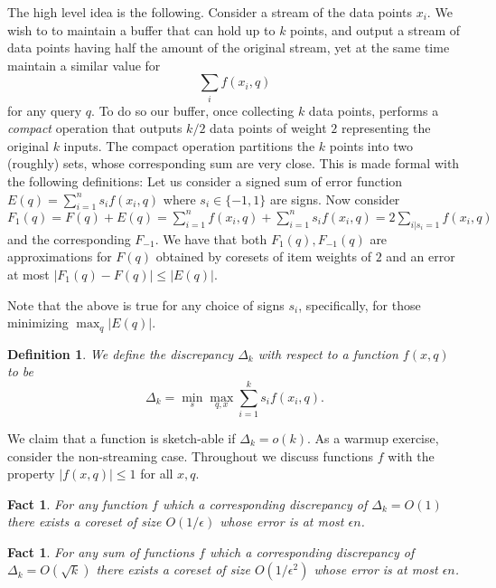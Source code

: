 \documentclass{article} %
\newtheorem{fact}[theorem]{Fact}
\newcommand{\eps}{\epsilon}
\newtheorem{definition}{Definition}
\begin{document}
The high level idea is the following. Consider a stream of the data points $x_i$. We wish to to maintain a buffer that can hold up to $k$ points, and output a stream of data points having half the amount of the original stream, yet at the same time maintain a similar value for 
$$ \sum_i f(x_i, q) $$
for any query $q$. To do so our buffer, once collecting $k$ data points, performs a \emph{compact} operation that outputs $k/2$ data points of weight $2$ representing the original $k$ inputs. The compact operation partitions the $k$ points into two (roughly) sets, whose corresponding sum are very close. This is made formal with the following definitions: Let us consider a signed sum of error function $E(q) = \sum_{i=1}^{n} s_i f(x_i,q)$ where $s_i \in \{-1,1\}$ are signs.
Now consider $F_1(q) = F(q) + E(q) = \sum_{i=1}^{n} f(x_i,q)  + \sum_{i=1}^{n} s_i f(x_i,q)  = 2 \sum_{i | s_i=1} f(x_i,q)$ and the corresponding $F_{-1}$. We have that both $F_1(q), F_{-1}(q)$ are approximations for $F(q)$ obtained by coresets of item weights of $2$ and an error at most $|F_1(q) - F(q)| \le  | E(q)|$.

%
%
Note that the above is true for any choice of signs $s_i$, specifically, for those minimizing $\max_q | E(q)|$.
\begin{definition}
We define the discrepancy $\Delta_k$ with respect to a function $f(x,q)$ to be  
\[\Delta_k = \min_s \max_{q,x} \sum_{i=1}^{k} s_i f(x_i,q). \] 
\end{definition}
\noindent We claim that a function is sketch-able if $\Delta_k = o(k)$. 
As a warmup exercise, consider the non-streaming case. Throughout we discuss functions $f$ with the property $|f(x,q)| \leq 1$ for all $x,q$.


\begin{fact}
For any function $f$ which a corresponding discrepancy of $\Delta_k = O(1)$ there exists a coreset of size 
$O(1/\eps)$ whose error is at most $\eps n$.
\end{fact}
\begin{fact}
For any sum of functions $f$ which a corresponding discrepancy of $\Delta_k = O(\sqrt{k})$ there exists a coreset of size 
$O(1/\eps^2)$ whose error is at most $\eps n$.
\end{fact}
\end{document}
